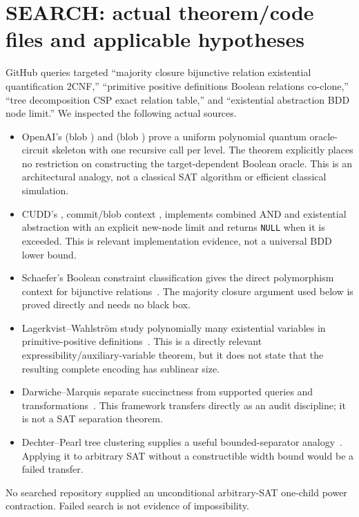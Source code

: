 \documentclass[11pt]{article}
\begin{document}
\section{SEARCH: actual theorem/code files and applicable hypotheses}
GitHub queries targeted ``majority closure bijunctive relation existential
quantification 2CNF,'' ``primitive positive definitions Boolean relations
co-clone,'' ``tree decomposition CSP exact relation table,'' and
``existential abstraction BDD node limit.''  We inspected the following
actual sources.
\begin{itemize}
\item OpenAI's
 (blob
\texttt{}) and
 (blob
\texttt{}) prove a uniform
polynomial quantum oracle-circuit skeleton with one recursive call per level.
The theorem explicitly places no restriction on constructing the
target-dependent Boolean oracle.  This is an architectural analogy, not a
classical SAT algorithm or efficient classical simulation.
\item CUDD's , commit/blob context
\texttt{}, implements combined AND
and existential abstraction with an explicit new-node limit and returns
\texttt{NULL} when it is exceeded.  This is relevant implementation evidence,
not a universal BDD lower bound.
\item Schaefer's Boolean constraint classification gives the direct
polymorphism context for bijunctive relations~\cite{schaefer}.  The majority
closure argument used below is proved directly and needs no black box.
\item Lagerkvist--Wahlstr\"om study polynomially many existential variables
in primitive-positive definitions~\cite{lagerkvist}.  This is a directly
relevant expressibility/auxiliary-variable theorem, but it does not state that
the resulting complete encoding has sublinear size.
\item Darwiche--Marquis separate succinctness from supported queries and
transformations~\cite{darwiche}.  This framework transfers directly as an
audit discipline; it is not a SAT separation theorem.
\item Dechter--Pearl tree clustering supplies a useful bounded-separator
analogy~\cite{dechter}.  Applying it to arbitrary SAT without a constructible
width bound would be a failed transfer.
\end{itemize}
No searched repository supplied an unconditional arbitrary-SAT one-child
power contraction.  Failed search is not evidence of impossibility.
\end{document}
